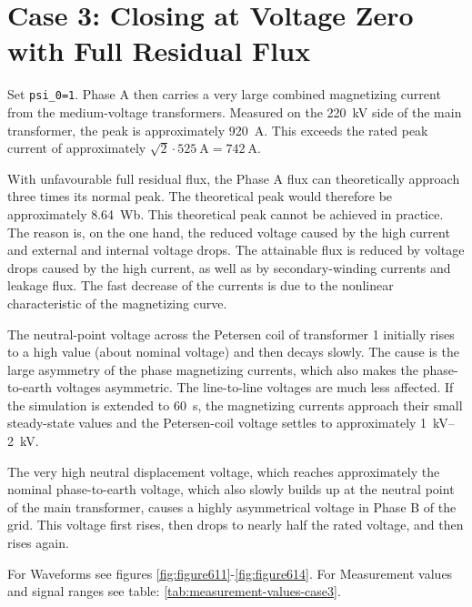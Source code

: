 


\section{Case 3: Closing at Voltage Zero with Full Residual Flux}
\label{sec:network-closing-residual-flux}

Set \texttt{psi\_0=1}. Phase A then carries a very large combined magnetizing
current from the medium-voltage transformers. Measured on the
\SI{220}{\kilo\volt} side of the main transformer, the peak is approximately
\SI{920}{\ampere}. This exceeds the rated peak current of
approximately $\sqrt{2}\cdot\SI{525}{\ampere}=\SI{742}{\ampere}$.

With unfavourable full residual flux, the Phase A flux can theoretically approach three times its normal peak. The theoretical peak would therefore be approximately \SI{8.64}{\weber}.
This theoretical peak cannot be achieved in practice. The reason is, on the one hand, the reduced voltage caused by the high current and external and internal voltage drops. The attainable flux is reduced by voltage drops caused by the high current, as well as by secondary-winding currents and leakage flux. 
The fast decrease of the currents is due to the nonlinear characteristic of the magnetizing curve. 

The neutral-point voltage across the Petersen coil of transformer 1 initially rises to a high value (about nominal voltage) and then
decays slowly. The cause is the large asymmetry of the phase magnetizing
currents, which also makes the phase-to-earth voltages asymmetric. The
line-to-line voltages are much less affected. If the simulation is extended to
\SI{60}{\second}, the magnetizing currents approach their small steady-state
values and the Petersen-coil voltage settles to approximately
\SIrange{1}{2}{\kilo\volt}.

The very high neutral displacement voltage, which reaches approximately the nominal phase-to-earth voltage, which also slowly builds up at the neutral point of the main transformer, causes a highly asymmetrical voltage in Phase B of the grid. This voltage first rises, then drops to nearly half the rated voltage, and then rises again. 

For Waveforms see figures \ref{fig:figure611}-\ref{fig:figure614}. 
For Measurement values and signal ranges see table: \ref{tab:measurement-values-case3}.\\ 

